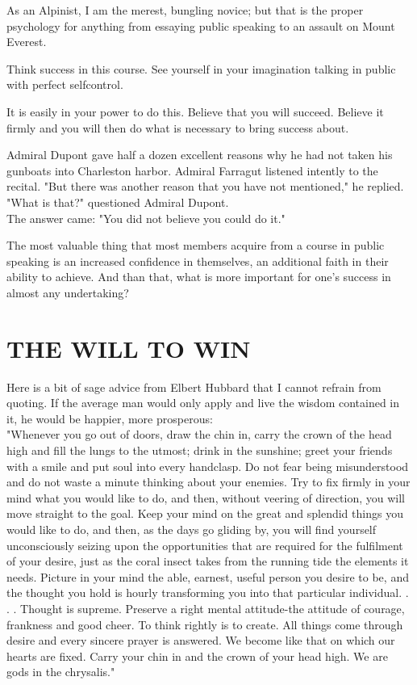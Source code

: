 \documentclass[10pt]{article}
\begin{document}
As an Alpinist, I am the merest, bungling novice; but that is the proper psychology for anything from essaying public speaking to an assault on Mount Everest.

Think success in this course. See yourself in your imagination talking in public with perfect selfcontrol.

It is easily in your power to do this. Believe that you will succeed. Believe it firmly and you will then do what is necessary to bring success about.

Admiral Dupont gave half a dozen excellent reasons why he had not taken his gunboats into Charleston harbor. Admiral Farragut listened intently to the recital. "But there was another reason that you have not mentioned," he replied.\\
"What is that?" questioned Admiral Dupont.\\
The answer came: "You did not believe you could do it."

The most valuable thing that most members acquire from a course in public speaking is an increased confidence in themselves, an additional faith in their ability to achieve. And than that, what is more important for one's success in almost any undertaking?

\section*{THE WILL TO WIN}
Here is a bit of sage advice from Elbert Hubbard that I cannot refrain from quoting. If the average man would only apply and live the wisdom contained in it, he would be happier, more prosperous:\\
"Whenever you go out of doors, draw the chin in, carry the crown of the head high and fill the lungs to the utmost; drink in the sunshine; greet your friends with a smile and put soul into every handclasp. Do not fear being misunderstood and do not waste a minute thinking about your enemies. Try to fix firmly in your mind what you would like to do, and then, without veering of direction, you will move straight to the goal. Keep your mind on the great and splendid things you would like to do, and then, as the days go gliding by, you will find yourself unconsciously seizing upon the opportunities that are required for the fulfilment of your desire, just as the coral insect takes from the running tide the elements it needs. Picture in your mind the able, earnest, useful person you desire to be, and the thought you hold is hourly transforming you into that particular individual. . . . Thought is supreme. Preserve a right mental attitude-the attitude of courage, frankness and good cheer. To think rightly is to create. All things come through desire and every sincere prayer is answered. We become like that on which our hearts are fixed. Carry your chin in and the crown of your head high. We are gods in the chrysalis."
\end{document}
